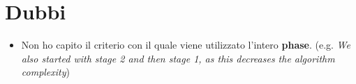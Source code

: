 \documentclass[12pt, a4paper]{report} %
\begin{document}
\section*{Dubbi}
\begin{itemize}
	\item Non ho capito il criterio con il quale viene utilizzato l'intero \textbf{phase}. (e.g. \textit{We also started with stage 2 and then stage 1, as this decreases the algorithm complexity})
\end{itemize}
\end{document}
